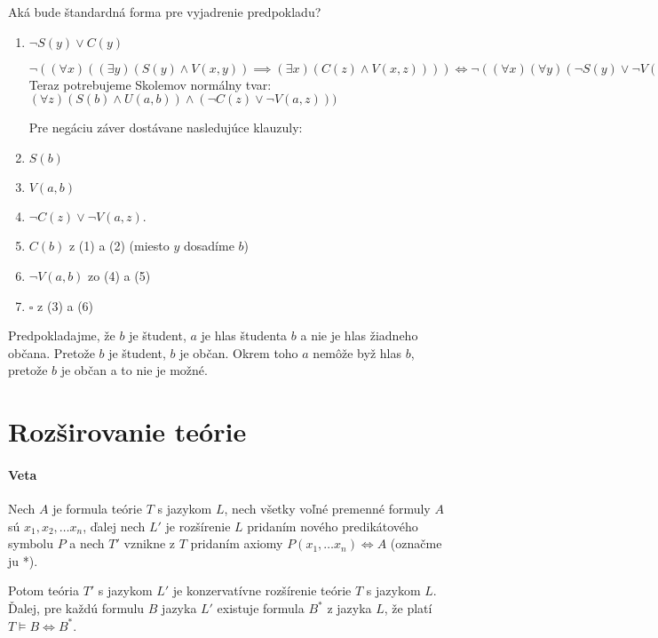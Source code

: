 Aká bude štandardná forma pre vyjadrenie predpokladu?
\begin{enumerate}
	\item $\neg S(y) \lor C(y)$
		\par $\neg ((\forall x) ((\exists y)(S(y)\land V(x,y)) \implies
		(\exists x)(C(z) \land V(x,z)))) \iff 
		\neg ((\forall x)(\forall y)(\neg S(y)\lor \neg V(x,y)) \lor
		(\exists z)(C(z)\land V(x,z))) \iff 
		\neg ((\forall x)(\forall y)(\exists x)(\neg S(y) \lor
		\neg U(x,y)\lor (C(z) \land V(x,z)))) \iff
		(\exists x)(\exists y)(\forall z) (S(y) \land V(x,y)) \land
		(\neg C(z) \lor \neg V(x,z))$
		Teraz potrebujeme Skolemov normálny tvar:
		$(\forall z)(S(b) \land U(a,b)) \land(\neg C(z) \lor \neg
		V(a,z)))$
		\par Pre negáciu záver dostávane nasledujúce klauzuly:
	\item $S(b)$
	\item $V(a,b)$
	\item $\neg C(z) \lor \neg V(a,z)$.

	\item $C(b)$ z (1) a (2) (miesto $y$ dosadíme $b$)
	\item $\neg V(a,b)$ zo (4) a (5)
	\item $\square$ z (3)  a (6)
\end{enumerate}

\par Predpokladajme, že $b$ je študent, $a$ je hlas študenta $b$ a nie je hlas
žiadneho občana. Pretože $b$ je študent, $b$ je občan. Okrem toho $a$ nemôže byž
hlas $b$, pretože $b$ je občan a to nie je možné.

\section{Rozširovanie teórie}
\paragraph{Veta} Nech $A$ je formula teórie $T$ s jazykom $L$, nech všetky voľné
premenné formuly $A$ sú $x_1, x_2, \ldots x_n$, ďalej nech $L'$ je rozšírenie
$L$ pridaním nového predikátového symbolu $P$ a nech $T'$ vznikne z $T$ pridaním
axiomy $P(x_1, \ldots x_n) \iff A$ (označme ju *). 
\par Potom teória $T'$ s jazykom $L'$ je konzervatívne rozšírenie teórie $T$ s
jazykom $L$. Ďalej, pre každú formulu $B$ jazyka $L'$ existuje formula $B^*$ z
jazyka $L$, že platí $T \models  B \iff B^*$. 

